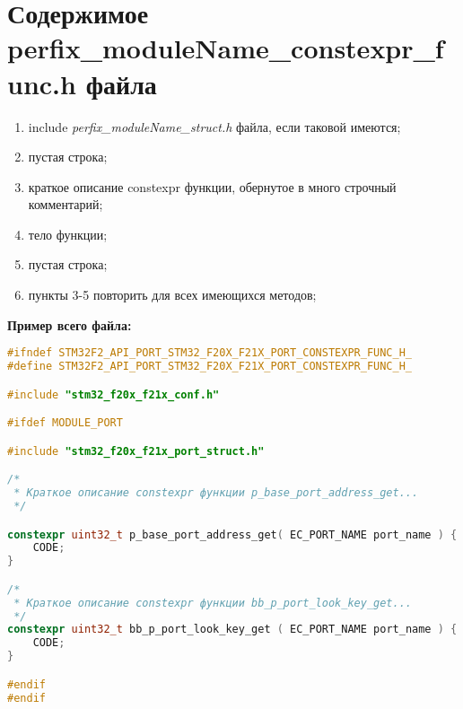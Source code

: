 \section{Содержимое perfix\-\_module\-Name\-\_const\-expr\-\_func.h файла}\label{p:conf:h}
\begin{enumerate}
	\item include \textit{perfix\-\_moduleName\-\_struct.h} файла, если таковой имеются;
	\item пустая строка;
	\item краткое описание constexpr функции, обернутое в много строчный комментарий;
	\item тело функции;
	\item пустая строка;
	\item пункты 3-5 повторить для всех имеющихся методов;
\end{enumerate}
\textbf{Пример всего файла:}\begin{lstlisting}[language=C++, frame=tlBR, basicstyle=\fontsize{10}{10}\ttfamily]
#ifndef STM32F2_API_PORT_STM32_F20X_F21X_PORT_CONSTEXPR_FUNC_H_
#define STM32F2_API_PORT_STM32_F20X_F21X_PORT_CONSTEXPR_FUNC_H_

#include "stm32_f20x_f21x_conf.h"

#ifdef MODULE_PORT

#include "stm32_f20x_f21x_port_struct.h"

/*
 * Краткое описание constexpr функции p_base_port_address_get...
 */

constexpr uint32_t p_base_port_address_get( EC_PORT_NAME port_name ) {
	CODE;
}

/*
 * Краткое описание constexpr функции bb_p_port_look_key_get...
 */
constexpr uint32_t bb_p_port_look_key_get ( EC_PORT_NAME port_name ) {
	CODE;
}

#endif
#endif
 \end{lstlisting}

